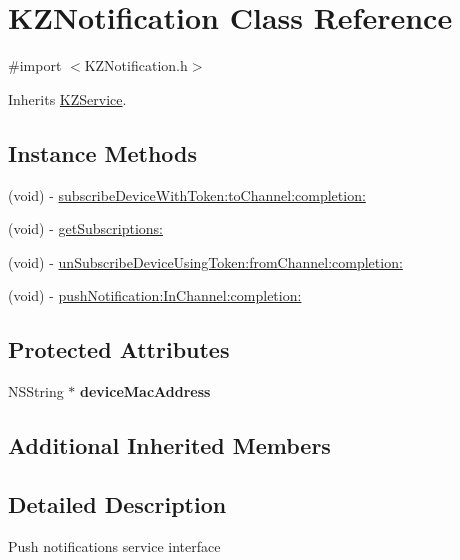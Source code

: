 \hypertarget{interface_k_z_notification}{\section{K\-Z\-Notification Class Reference}
\label{interface_k_z_notification}
}


{\ttfamily \#import $<$K\-Z\-Notification.\-h$>$}



Inherits \hyperlink{interface_k_z_service}{K\-Z\-Service}.

\subsection*{Instance Methods}
\begin{DoxyCompactItemize}
\item 
(void) -\/ \hyperlink{interface_k_z_notification_a6cca6fabb8646c8c40c3331cb06561c8}{subscribe\-Device\-With\-Token\-:to\-Channel\-:completion\-:}
\item 
(void) -\/ \hyperlink{interface_k_z_notification_aba4d0e0e7b48791ad413784262e8e2d0}{get\-Subscriptions\-:}
\item 
(void) -\/ \hyperlink{interface_k_z_notification_afd6efe89efe0964b94c77438f71479e4}{un\-Subscribe\-Device\-Using\-Token\-:from\-Channel\-:completion\-:}
\item 
(void) -\/ \hyperlink{interface_k_z_notification_ad5abe8288d6044a968c451d4c88a32cf}{push\-Notification\-:\-In\-Channel\-:completion\-:}
\end{DoxyCompactItemize}
\subsection*{Protected Attributes}
\begin{DoxyCompactItemize}
\item 
\hypertarget{interface_k_z_notification_a944b5c071cbb8adb31f64d6d91271f8c}{N\-S\-String $\ast$ {\bfseries device\-Mac\-Address}}\label{interface_k_z_notification_a944b5c071cbb8adb31f64d6d91271f8c}

\end{DoxyCompactItemize}
\subsection*{Additional Inherited Members}


\subsection{Detailed Description}
Push notifications service interface

